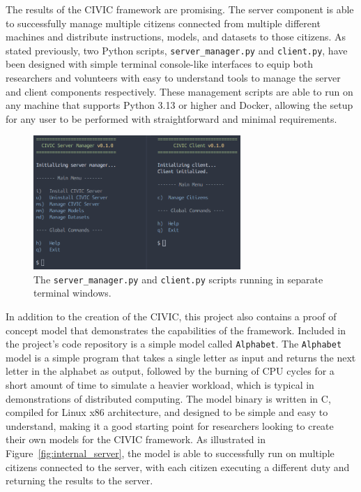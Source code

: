 \documentclass[11pt]{article}
\begin{document}
The results of the CIVIC framework are promising. The server component is able to successfully manage multiple citizens connected from multiple different machines and distribute instructions, models, and datasets to those citizens. As stated previously, two Python scripts, \verb|server_manager.py| and \verb|client.py|, have been designed with simple terminal console-like interfaces to equip both researchers and volunteers with easy to understand tools to manage the server and client components respectively. These management scripts are able to run on any machine that supports Python 3.13 or higher and Docker, allowing the setup for any user to be performed with straightforward and minimal requirements.

\begin{figure}[h]
    \centering
    \includegraphics[width=0.7\textwidth]{./figures/terminals.png}
    \caption{\small The \texttt{server\_manager.py} and \texttt{client.py} scripts running in separate terminal windows.}\label{fig:terminals}
\end{figure}

In addition to the creation of the CIVIC, this project also contains a proof of concept model that demonstrates the capabilities of the framework. Included in the project's code repository is a simple model called \verb|Alphabet|. The \verb|Alphabet| model is a simple program that takes a single letter as input and returns the next letter in the alphabet as output, followed by the burning of CPU cycles for a short amount of time to simulate a heavier workload, which is typical in demonstrations of distributed computing. The model binary is written in C, compiled for Linux x86 architecture, and designed to be simple and easy to understand, making it a good starting point for researchers looking to create their own models for the CIVIC framework. As illustrated in Figure~\ref{fig:internal_server}, the model is able to successfully run on multiple citizens connected to the server, with each citizen executing a different duty and returning the results to the server. 
\end{document}
